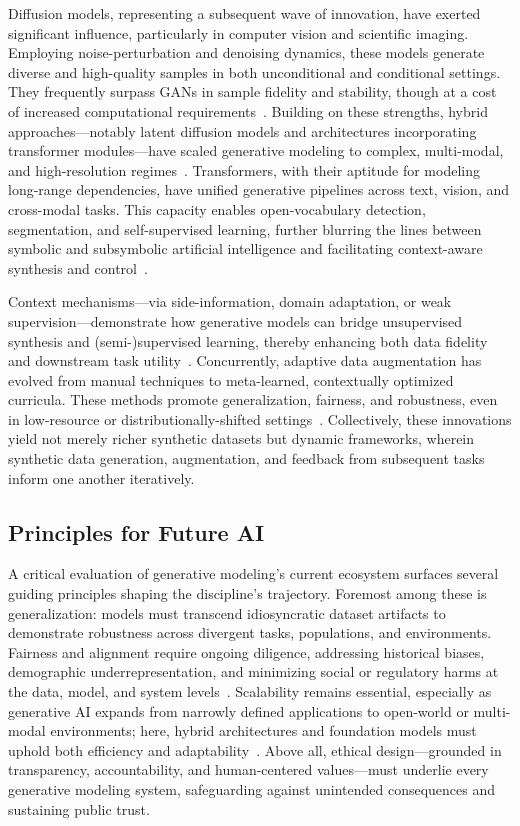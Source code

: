 \documentclass[11pt]{article}
\begin{document}
Diffusion models, representing a subsequent wave of innovation, have exerted significant influence, particularly in computer vision and scientific imaging. Employing noise-perturbation and denoising dynamics, these models generate diverse and high-quality samples in both unconditional and conditional settings. They frequently surpass GANs in sample fidelity and stability, though at a cost of increased computational requirements~\cite{ref82,ref96,ref97,ref101}. Building on these strengths, hybrid approaches---notably latent diffusion models and architectures incorporating transformer modules---have scaled generative modeling to complex, multi-modal, and high-resolution regimes~\cite{ref97,ref102}. Transformers, with their aptitude for modeling long-range dependencies, have unified generative pipelines across text, vision, and cross-modal tasks. This capacity enables open-vocabulary detection, segmentation, and self-supervised learning, further blurring the lines between symbolic and subsymbolic artificial intelligence and facilitating context-aware synthesis and control~\cite{ref93,ref95,ref100,ref102,ref81,ref83}.

Context mechanisms---via side-information, domain adaptation, or weak supervision---demonstrate how generative models can bridge unsupervised synthesis and (semi-)supervised learning, thereby enhancing both data fidelity and downstream task utility~\cite{ref92,ref93,ref94}. Concurrently, adaptive data augmentation has evolved from manual techniques to meta-learned, contextually optimized curricula. These methods promote generalization, fairness, and robustness, even in low-resource or distributionally-shifted settings~\cite{ref95,ref98,ref99,ref100,ref101}. Collectively, these innovations yield not merely richer synthetic datasets but dynamic frameworks, wherein synthetic data generation, augmentation, and feedback from subsequent tasks inform one another iteratively.

\subsection{Principles for Future AI}

A critical evaluation of generative modeling's current ecosystem surfaces several guiding principles shaping the discipline's trajectory. Foremost among these is generalization: models must transcend idiosyncratic dataset artifacts to demonstrate robustness across divergent tasks, populations, and environments. Fairness and alignment require ongoing diligence, addressing historical biases, demographic underrepresentation, and minimizing social or regulatory harms at the data, model, and system levels~\cite{ref82,ref95,ref98,ref99,ref100}. Scalability remains essential, especially as generative AI expands from narrowly defined applications to open-world or multi-modal environments; here, hybrid architectures and foundation models must uphold both efficiency and adaptability~\cite{ref74,ref75,ref92,ref97,ref102}. Above all, ethical design---grounded in transparency, accountability, and human-centered values---must underlie every generative modeling system, safeguarding against unintended consequences and sustaining public trust.
\end{document}
